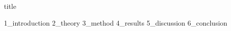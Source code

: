 \documentclass{article}
\begin{document}
{title}

\frontmatter

\begin{abstract}
    {0_abstract}
\end{abstract}
\clearpage

\tableofcontents

\listoffigures
\listoftables

\begin{mdframed}
\begin{multicols}{2}
\printnomenclature
\end{multicols}
\vfill
\end{mdframed}

\mainmatter


{1_introduction}
{2_theory}
{3_method}
{4_results}
{5_discussion}
{6_conclusion}

\newpage


\addappendix

\end{document}
